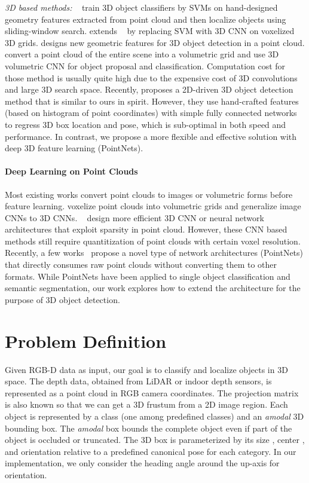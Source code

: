 \documentclass[10pt,twocolumn,letterpaper]{article}
\begin{document}
\emph{3D based methods:} ~\cite{wang2015voting, song2014sliding} train 3D object classifiers by SVMs on hand-designed geometry features extracted from point cloud and then localize objects using sliding-window search. \cite{engelcke2017vote3deep} extends ~\cite{wang2015voting} by replacing SVM with 3D CNN on voxelized 3D grids. \cite{ren2016three} designs new geometric features for 3D object detection in a point cloud. \cite{song2016deep, li20163d} convert a point cloud of the entire scene into a volumetric grid and use 3D volumetric CNN for object proposal and classification. Computation cost for those method is usually quite high due to the expensive cost of 3D convolutions and large 3D search space.
Recently, \cite{lahoud20172d} proposes a 2D-driven 3D object detection method that is similar to ours in spirit. However, they use hand-crafted features (based on histogram of point coordinates) with simple fully connected networks to regress 3D box location and pose, which is sub-optimal in both speed and performance. In contrast, we propose a more flexible and effective solution with deep 3D feature learning (PointNets).





\paragraph{Deep Learning on Point Clouds}
Most existing works convert point clouds to images or volumetric forms before feature learning. \cite{wu20153d, maturana2015voxnet, qi2016volumetric} voxelize point clouds into volumetric grids and generalize image CNNs to 3D CNNs. ~\cite{li2016fpnn, riegler2016octnet, wang2017cnn, engelcke2017vote3deep} design more efficient 3D CNN or neural network architectures that exploit sparsity in point cloud.
However, these CNN based methods still require quantitization of point clouds with certain voxel resolution.
Recently, a few works~\cite{qi2017pointnet,qi2017pointnetplusplus} propose a novel type of network architectures (PointNets) that directly consumes raw point clouds without converting them to other formats. While PointNets have been applied to single object classification and semantic segmentation, our work explores how to extend the architecture for the purpose of 3D object detection. 
\section{Problem Definition}
\label{sec:problem_definition}
Given RGB-D data as input, our goal is to classify and localize objects in 3D space. The depth data, obtained from LiDAR or indoor depth sensors, is represented as a point cloud in RGB camera coordinates. The projection matrix is also known so that we can get a 3D frustum from a 2D image region. Each object is represented by a class (one among  predefined classes) and an \emph{amodal} 3D bounding box. The \emph{amodal} box bounds the complete object even if part of the object is occluded or truncated. The 3D box is parameterized by its size , center , and orientation  relative to a predefined canonical pose for each category. In our implementation, we only consider the heading angle  around the up-axis for orientation. 
\end{document}
